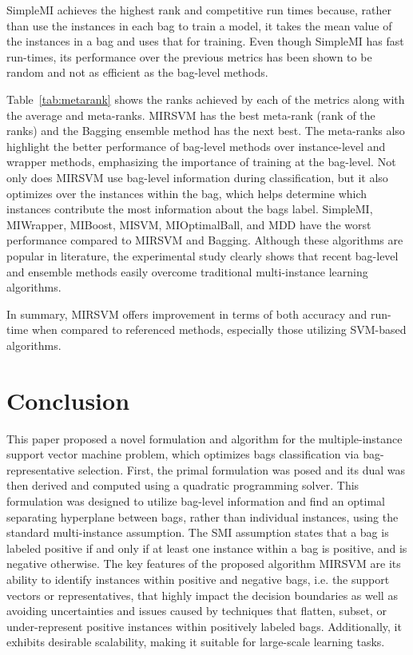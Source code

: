 SimpleMI achieves the highest rank and competitive run times because, rather than use the instances in each bag to train a model, it takes the mean value of the instances in a bag and uses that for training. Even though SimpleMI has fast run-times, its performance over the previous metrics has been shown to be random and not as efficient as the bag-level methods.

Table~\ref{tab:metarank} shows the ranks achieved by each of the metrics along with the average and meta-ranks. MIRSVM has the best meta-rank (rank of the ranks) and the Bagging ensemble method has the next best. The meta-ranks also highlight the better performance of bag-level methods over instance-level and wrapper methods, emphasizing the importance of training at the bag-level. Not only does MIRSVM use bag-level information during classification, but it also optimizes over the instances within the bag, which helps determine which instances contribute the most information about the bags label. SimpleMI, MIWrapper, MIBoost, MISVM, MIOptimalBall, and MDD have the worst performance compared to MIRSVM and Bagging. Although these algorithms are popular in literature, the experimental study clearly shows that recent bag-level and ensemble methods easily overcome traditional multi-instance learning algorithms. 

In summary, MIRSVM offers improvement in terms of both accuracy and run-time when compared to referenced methods, especially those utilizing SVM-based algorithms.

\section{Conclusion}\label{sec:conclusion}
This paper proposed a novel formulation and algorithm for the multiple-instance support vector machine problem, which optimizes bags classification via bag-representative selection. First, the primal formulation was posed and its dual was then derived and computed using a quadratic programming solver. This formulation was designed to utilize bag-level information and find an optimal separating hyperplane between bags, rather than individual instances, using the standard multi-instance assumption. The SMI assumption states that a bag is labeled positive if and only if at least one instance within a bag is positive, and is negative otherwise. The key features of the proposed algorithm MIRSVM are its ability to identify instances within positive and negative bags, i.e. the support vectors or representatives, that highly impact the decision boundaries as well as avoiding uncertainties and issues caused by techniques that flatten, subset, or under-represent positive instances within positively labeled bags. Additionally, it exhibits desirable scalability, making it suitable for large-scale learning tasks.

